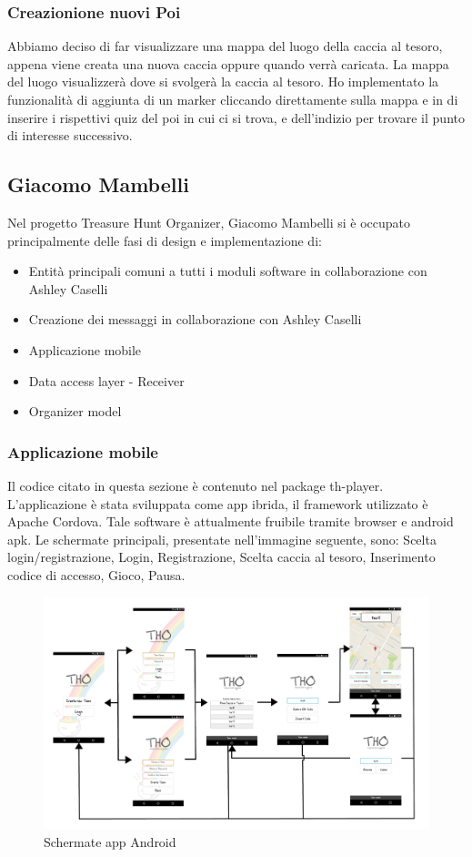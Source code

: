 \documentclass[12pt, italian]{article}
\begin{document}
\subsubsection{Creazionione nuovi Poi}
Abbiamo deciso di far visualizzare una mappa del luogo della caccia al tesoro, appena viene creata una nuova caccia oppure quando verrà caricata. La mappa del luogo visualizzerà dove si svolgerà la caccia al tesoro. Ho implementato la funzionalità di aggiunta di un marker cliccando direttamente sulla mappa e in di inserire i rispettivi quiz del poi in cui ci si trova, e dell'indizio per trovare il punto di interesse successivo.
\subsection{Giacomo Mambelli}
Nel progetto Treasure Hunt Organizer, Giacomo Mambelli si è occupato principalmente delle fasi di design e implementazione di:
\begin{itemize}
	\item Entità principali comuni a tutti i moduli software in collaborazione con Ashley Caselli
	\item Creazione dei messaggi in collaborazione con Ashley Caselli
	\item Applicazione mobile
	\item Data access layer - Receiver
	\item Organizer model
\end{itemize}
\subsubsection{Applicazione mobile}
Il codice citato in questa sezione è contenuto nel package th-player.
L'applicazione è stata sviluppata come app ibrida, il framework utilizzato è Apache Cordova.
Tale software è attualmente fruibile tramite browser e android apk.
Le schermate principali, presentate nell'immagine seguente, sono: Scelta login/registrazione, Login, Registrazione, Scelta caccia al tesoro, Inserimento codice di accesso, Gioco, Pausa.

\begin{figure}[H]
	\centering
	\includegraphics[width=1\textwidth]{img/flusso01.png}
	\caption{Schermate app Android}
\end{figure}
\end{document}
